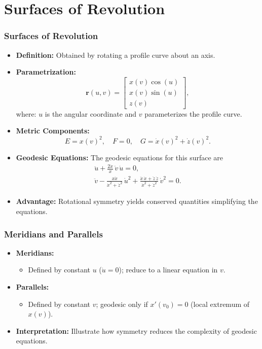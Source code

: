 \documentclass[12pt]{beamer}
\begin{document}
\section{Surfaces of Revolution}
\begin{frame}
  \frametitle{Surfaces of Revolution}
  \footnotesize
  \begin{itemize}
    \item \textbf{Definition:} Obtained by rotating a profile curve about an axis.
    \item \textbf{Parametrization:}
      \[
      \mathbf{r}(u,v) = \begin{bmatrix} x(v)\cos(u) \\ x(v)\sin(u) \\ z(v) \end{bmatrix},
      \]
      where: \(u\) is the angular coordinate and \(v\) parameterizes the profile curve.
    \item \textbf{Metric Components:}
      \[
      E = x(v)^2,\quad F = 0,\quad G = \dot{x}(v)^2 + \dot{z}(v)^2.
      \]
      \item \textbf{Geodesic Equations:}
      The geodesic equations for this surface are
      \begin{align*}
    \ddot{u} + \frac{2\dot{x}}{x}\,\dot{v}\,\dot{u} = 0,\\
    \ddot{v} - \frac{x\dot{x}}{\dot{x}^2 + \dot{z}^2}\,\dot{u}^2 + \frac{\ddot{x}\,\dot{x} + \ddot{z}\,\dot{z}}{\dot{x}^2 + \dot{z}^2}\,\dot{v}^2 = 0.
\end{align*}
    \item \textbf{Advantage:} Rotational symmetry yields conserved quantities simplifying the equations.
  \end{itemize}
\end{frame}

\begin{frame}
  \frametitle{Meridians and Parallels}
  \begin{itemize}
    \item \textbf{Meridians:} 
      \begin{itemize}
         \item Defined by constant \(u\) (\(\dot{u}=0\)); reduce to a linear equation in \(v\).
      \end{itemize}
    \item \textbf{Parallels:} 
      \begin{itemize}
         \item Defined by constant \(v\); geodesic only if \(x'(v_0)=0\) (local extremum of \(x(v)\)).
      \end{itemize}
    \item \textbf{Interpretation:} Illustrate how symmetry reduces the complexity of geodesic equations.
  \end{itemize}
\end{frame}
\end{document}
